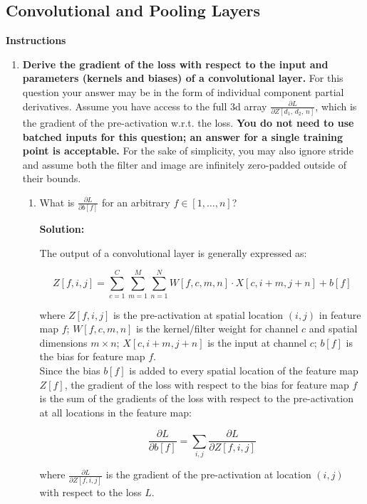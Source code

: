 \documentclass{article}
\newenvironment{solution}{\color{blue} \smallskip \textbf{Solution:}}{}
\begin{document}
\subsection{Convolutional and Pooling Layers}
\textbf{Instructions}
\begin{enumerate}
    \item 
    \textbf{Derive the gradient of the loss with respect to the input and parameters (kernels and biases) of a convolutional layer.} 
    For this question your answer may be in the form of individual component partial derivatives. 
    Assume you have access to the full 3d array $\frac{\partial L}{\partial Z[d_1,\, d_2,\, n]}$, which is the gradient of the pre-activation w.r.t. the loss. 
    \textbf{You do not need to use batched inputs for this question; an answer for a single training point is acceptable.} 
    For the sake of simplicity, you may also ignore stride and assume both the filter and image are infinitely zero-padded outside of their bounds.
    \begin{enumerate}
        \item 
        What is $\frac{\partial L}{\partial b[f]}$ for an arbitrary $f \in [1, \dots, n]$?
        
\begin{solution}


The output of a convolutional layer is generally expressed as:

\[
Z[f, i, j] = \sum_{c=1}^{C} \sum_{m=1}^{M} \sum_{n=1}^{N} W[f, c, m, n] \cdot X[c, i+m, j+n] + b[f]
\]

where \( Z[f, i, j] \) is the pre-activation at spatial location \( (i, j) \) in feature map \( f \); \( W[f, c, m, n] \) is the kernel/filter weight for channel \( c \) and spatial dimensions \( m \times n \); \( X[c, i+m, j+n] \) is the input at channel \( c \); \( b[f] \) is the bias for feature map \( f \).\\


Since the bias \( b[f] \) is added to every spatial location of the feature map \( Z[f] \), the gradient of the loss with respect to the bias for feature map \( f \) is the sum of the gradients of the loss with respect to the pre-activation at all locations in the feature map:

\[
\frac{\partial L}{\partial b[f]} = \sum_{i,j} \frac{\partial L}{\partial Z[f, i, j]}
\]

where \( \frac{\partial L}{\partial Z[f, i, j]} \) is the gradient of the pre-activation at location \( (i, j) \) with respect to the loss \( L \).\\\\




\end{solution}
\end{enumerate}
\end{enumerate}
\end{document}
